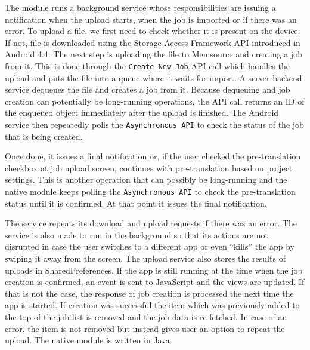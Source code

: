 The module runs a background service whose responsibilities are issuing a notification when the upload starts, when the job is imported or if there was an error. To upload a file, we first need to check whether it is present on the device. If not, file is downloaded using the Storage Access Framework API introduced in Android 4.4. The next step is uploading the file to Memsource and creating a job from it. This is done through  the \texttt{Create New Job} API call which handles the upload and puts the file into a queue where it waits for import. A server backend service dequeues the file and creates a job from it. Because dequeuing and job creation can potentially be long-running operations, the API call returns an ID of the enqueued object immediately after the upload is finished. The Android service then repeatedly polls the \texttt{Asynchronous API} to check the status of the job that is being created. 

Once done, it issues a final notification or, if the user checked the pre-translation checkbox at job upload screen, continues with pre-translation based on project settings. This is another operation that can possibly be long-running and the native module keeps polling the \texttt{Asynchronous API} to check the pre-translation status until it is confirmed. At that point it issues the final notification.


The service repeats its download and upload requests if there was an error. The service is also made to run in the background so that its actions are not disrupted in case the user switches to a different app or even “kills” the app by swiping it away from the screen. The upload service also stores the results of uploads in SharedPreferences.
If the app is still running at the time when the job creation is confirmed, an event is sent to JavaScript and the views are updated. If that is not the case, the response of job creation is processed the next time the app is started. If creation was successful the item which was previously added to the top of the job list is removed and the job data is re-fetched. In case of an error, the item is not removed but instead gives user an option to repeat the upload. The native module is written in Java. 
 

